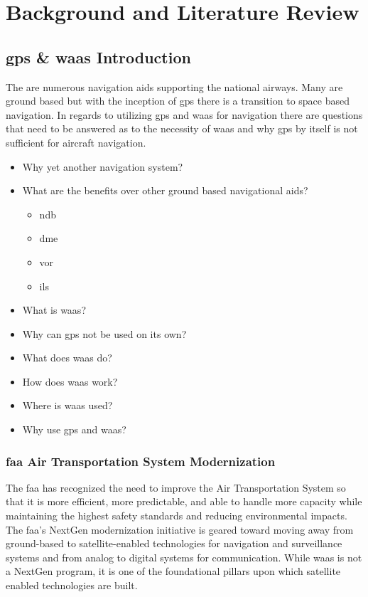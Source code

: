 \acresetall
\chapter{Background and Literature Review}
\label{ch:background}

\section{\ac{gps} \& \ac{waas} Introduction}\label{gps-waas-introduction}

The are numerous navigation aids supporting the national airways. Many
are ground based but with the inception of \ac{gps} there is a transition to space based navigation. In regards to utilizing \ac{gps} and \ac{waas} for navigation there are questions that need to be answered as to the necessity of \ac{waas} and why \ac{gps} by itself is not sufficient for aircraft navigation.

\begin{itemize}
\tightlist
\item
  Why yet another navigation system?
\item
  What are the benefits over other ground based navigational aids?
  \begin{itemize}
  \tightlist
    \item
      \ac{ndb}
    \item
      \ac{dme}
    \item
      \ac{vor}
    \item
      \ac{ils}
  \end{itemize}
\item
  What is \ac{waas}?
\item
  Why can \ac{gps} not be used on its own?
\item
  What does \ac{waas} do?
\item
  How does \ac{waas} work?
\item
  Where is \ac{waas} used?
\item
  Why use \ac{gps} and \ac{waas}?
\end{itemize}

\subsection{\ac{faa} Air Transportation System
Modernization}\label{faa-air-transportation-system-modernization}

The \ac{faa} has recognized the need to improve the Air Transportation System
so that it is more efficient, more predictable, and able to handle more
capacity while maintaining the highest safety standards and reducing
environmental impacts. The \ac{faa}'s NextGen modernization initiative is
geared toward moving away from ground-based to satellite-enabled
technologies for navigation and surveillance systems and from analog to
digital systems for communication. While \ac{waas} is not a NextGen program,
it is one of the foundational pillars upon which satellite enabled
technologies are built.

